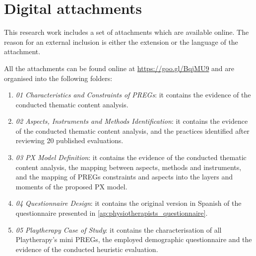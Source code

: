 \chapter{Digital attachments}
\label{ap:digital_attachments}
This research work includes a set of attachments which are available online. The reason for an external inclusion is either the extension or the language of the attachment.

All the attachments can be found online at \url{https://goo.gl/BqjMU9} and are organised into the following folders:

\begin{enumerate}
    \item \emph{01 Characteristics and Constraints of \acp{PREG}}: it contains the evidence of the conducted thematic content analysis.
    \item \emph{02 Aspects, Instruments and Methods Identification}: it contains the evidence of the conducted thematic content analysis, and the practices identified after reviewing 20 published evaluations. 
    \item \emph{03 \ac{PX} Model Definition}: it contains the evidence of the conducted thematic content analysis, the mapping between aspects, methods and instruments, and the mapping of \acp{PREG} constraints and aspects into the layers and moments of the proposed \ac{PX} model.
    \item \emph{04 Questionnaire Design}: it contains the original version in Spanish of the questionnaire presented in \autoref{ap:physiotherapists_questionnaire}. 
    \item \emph{05 Playtherapy Case of Study}: it contains the characterisation of all Playtherapy's mini \acp{PREG}, the employed demographic questionnaire and the evidence of the conducted heuristic evaluation.
\end{enumerate}